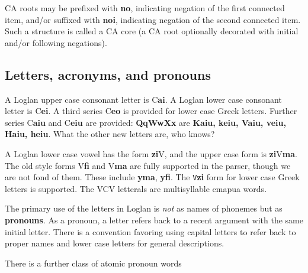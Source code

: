 \documentclass[12pt]{book}
\begin{document}
CA roots may be prefixed with {\bf no}, indicating negation of the first connected item,  and/or suffixed with {\bf noi}, indicating negation of the second connected item.
Such a structure is called a CA core (a CA root optionally decorated with initial and/or following negations).

\subsection{Letters, acronyms, and pronouns}

A Loglan upper case consonant letter is C{\bf ai}.   A Loglan lower case consonant letter is C{\bf ei}.   A third series C{\bf eo} is provided for lower case Greek letters.
Further series C{\bf aiu} and C{\bf eiu} are provided:  {\bf QqWwXx} are {\bf Kaiu, keiu, Vaiu, veiu, Haiu, heiu}.  What the other new letters are, who knows?

A Loglan lower case vowel has the form {\bf zi}V, and the upper case form is {\bf zi}V{\bf ma}.  The old style forms V{\bf fi} and V{\bf ma} are fully supported in the parser, though we are not fond of them.  These include {\bf yma}, {\bf yfi}.  The {\tt V}{\bf zi} form for lower case Greek letters is supported.   The VCV letterals are multisyllable cmapua words.

The primary use of the letters in Loglan is {\em not\/} as names of phonemes but as {\bf pronouns}.  As a pronoun, a letter refers back to a recent argument with the
same initial letter.   There is a convention favoring using capital letters to refer back to proper names and lower case letters for general descriptions.

There is a further class of atomic pronoun words 
\end{document}
